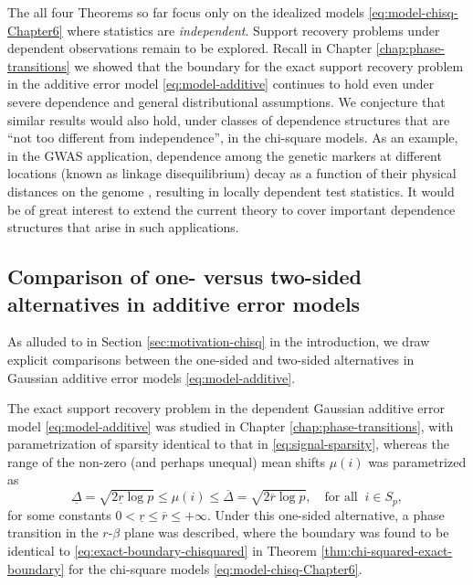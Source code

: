 The all four Theorems so far focus only on the idealized models \eqref{eq:model-chisq-Chapter6} where statistics are \emph{independent}.
Support recovery problems under dependent observations remain to be explored.
Recall in Chapter \ref{chap:phase-transitions} we showed that the boundary for the exact support recovery problem in the additive error model \eqref{eq:model-additive} continues to hold even under severe dependence and general distributional assumptions.
We conjecture that similar results would also hold, under classes of dependence structures that are ``not too different from independence'', in the chi-square models.
As an example, in the GWAS application, dependence among the genetic markers at different locations (known as linkage disequilibrium) decay as a function of their physical distances on the genome \citep{bush2012genome}, resulting in locally dependent test statistics.
It would be of great interest to extend the current theory to cover important dependence structures that arise in such applications.


\subsection{Comparison of one- versus two-sided alternatives in additive error models}
\label{subsec:one-vs-two-sided}


As alluded to in Section \ref{sec:motivation-chisq} in the introduction, we draw explicit comparisons between the one-sided and two-sided alternatives in Gaussian additive error models \eqref{eq:model-additive}.

The exact support recovery problem in the dependent Gaussian additive error model \eqref{eq:model-additive} was studied in Chapter \ref{chap:phase-transitions}, with parametrization of sparsity identical to that in \eqref{eq:signal-sparsity}, whereas the range of the non-zero (and perhaps unequal) mean shifts $\mu(i)$ was parametrized as 
\begin{equation*}
    \underline{\Delta} = \sqrt{2\underline{r}\log{p}}
    \le \mu(i) \le
    \overline{\Delta} = \sqrt{2\overline{r}\log{p}}, \quad \text{for all}\;\;i\in S_p,
\end{equation*}
for some constants $0<\underline{r}\le\overline{r}\le+\infty$.
Under this one-sided alternative, a phase transition in the $r$-$\beta$ plane was described, where the boundary was found to be identical to \eqref{eq:exact-boundary-chisquared} in Theorem \ref{thm:chi-squared-exact-boundary} for the chi-square models \eqref{eq:model-chisq-Chapter6}. 

